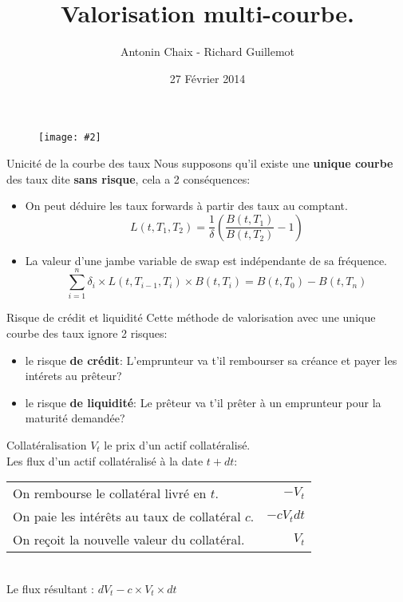 \documentclass{beamer}
\title[Produits dérivés de taux]{Valorisation multi-courbe. }
\author{Antonin Chaix - Richard Guillemot}
\institute{Master IFMA}
\date{27 Février 2014}
\newcommand{\FIG}[2]{\texttt{[image: \#2]}}
\begin{document}
\begin{frame}
\titlepage
\begin{figure}[h]
\centering \FIG{5cm}{figures/UPMC_IFMA.jpg}
\end{figure}
\end{frame}

\begin{frame}{Unicité de la courbe des taux}
Nous supposons qu'il existe une \textbf{unique courbe} des taux dite \textbf{sans risque}, cela a 2 conséquences:
\begin{itemize}
\item On peut déduire les taux forwards à partir des taux au comptant.
\[
L(t,T_1, T_2)=\frac{1}{\delta}\left(\frac{B(t,T_1)}{B(t,T_2)}-1\right)
\]
\item La valeur d'une jambe variable de swap est indépendante de sa fréquence.
\[
\sum_{i=1}^{n}\delta_i \times L(t,T_{i-1}, T_i) \times  B(t,T_i)=B(t,T_0)-B(t,T_n)
\]
\end{itemize}
\end{frame}

\begin{frame}{Risque de crédit et liquidité}
Cette méthode de valorisation avec une unique courbe des taux ignore 2 risques:
\begin{itemize}
\item le risque \textbf{de crédit}: L'emprunteur va t'il rembourser sa créance et payer les intérets au prêteur?
\item le risque \textbf{de liquidité}: Le prêteur va t'il prêter à un emprunteur pour la maturité demandée?
\end{itemize}
\end{frame}

\begin{frame}{Collatéralisation}
$V_t$ le prix d'un actif collatéralisé.\\
\vspace{0.5cm}
Les flux d'un actif collatéralisé à la date $t+dt$:\\
\vspace{0.5cm}
\begin{tabular}{l|r}
On rembourse le collatéral livré en $t$. & $-V_t$ \\
On paie les intérêts au taux de collatéral $c$.& $-c V_t dt$\\
On reçoit la nouvelle valeur du collatéral.& $V_t$ \\
\end{tabular}
\vspace{0.5cm}\\
Le flux résultant : $dV_t - c \times V_t \times dt$
\end{frame}
\end{document}
